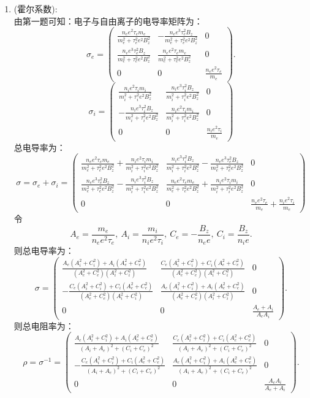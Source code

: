 \documentclass[reqno,a4paper,12pt]{amsart}
\begin{document}
\begin{enumerate}
	\item (霍尔系数): \\
	由第一题可知：电子与自由离子的电导率矩阵为：
	\[
		\sigma_e = \begin{pmatrix}
			\frac{n_ee^2\tau_em_e}{m_e^2 + \tau_e^2e^2B_z^2} & -\frac{n_ee^3\tau_e^2B_z}{m_e^2 + \tau_e^2e^2B_z^2} & 0 \\
			\frac{n_ee^3\tau_e^2B_z}{m_e^2 + \tau_e^2e^2B_z^2} & \frac{n_ee^2\tau_em_e}{m_e^2 + \tau_e^2e^2B_z^2} & 0 \\
			0 & 0 & \frac{n_ee^2\tau_e}{m_e}
		\end{pmatrix}.
	\]
	\[
		\sigma_i = \begin{pmatrix}
			\frac{n_ie^2\tau_im_i}{m_i^2 + \tau_i^2e^2B_z^2} & \frac{n_ie^3\tau_i^2B_z}{m_i^2 + \tau_i^2e^2B_z^2} & 0 \\
			-\frac{n_ie^3\tau_i^2B_z}{m_i^2 + \tau_i^2e^2B_z^2} & \frac{n_ie^2\tau_im_i}{m_i^2 + \tau_i^2e^2B_z^2} & 0 \\
			0 & 0 & \frac{n_ie^2\tau_i}{m_e}
		\end{pmatrix}
	\]
	总电导率为：
	\[
		\sigma = \sigma_e + \sigma_i = \begin{pmatrix}
			\frac{n_ee^2\tau_em_e}{m_e^2 + \tau_e^2e^2B_z^2} + \frac{n_ie^2\tau_im_i}{m_i^2 + \tau_i^2e^2B_z^2} & \frac{n_ie^3\tau_i^2B_z}{m_i^2 + \tau_i^2e^2B_z^2} - \frac{n_ee^3\tau_e^2B_z}{m_e^2 + \tau_e^2e^2B_z^2} & 0 \\
			\frac{n_ee^3\tau_e^2B_z}{m_e^2 + \tau_e^2e^2B_z^2} - \frac{n_ie^3\tau_i^2B_z}{m_i^2 + \tau_i^2e^2B_z^2} & \frac{n_ee^2\tau_em_e}{m_e^2 + \tau_e^2e^2B_z^2} + \frac{n_ie^2\tau_im_i}{m_i^2 + \tau_i^2e^2B_z^2} & 0 \\
			0 & 0 & \frac{n_ee^2\tau_e}{m_e} + \frac{n_ie^2\tau_i}{m_e}
		\end{pmatrix}
	\]
	令
	\[
		A_e = \frac{m_e}{n_ee^2\tau_e}, ~ A_i = \frac{m_i}{n_ie^2\tau_i}, ~ C_e = -\frac{B_z}{n_ee}, ~ C_i = \frac{B_z}{n_ie}.
	\]
	则总电导率为：
	\[
		\sigma = \begin{pmatrix}
			\frac{A_e(A_i^2 + C_i^2) + A_i(A_e^2 + C_e^2)}{(A_e^2 + C_e^2)(A_i^2 + C_i^2)} & \frac{C_e(A_i^2 + C_i^2) + C_i(A_e^2 + C_e^2)}{(A_e^2 + C_e^2)(A_i^2 + C_i^2)} & 0 \\
			-\frac{C_e(A_i^2 + C_i^2) + C_i(A_e^2 + C_e^2)}{(A_e^2 + C_e^2)(A_i^2 + C_i^2)} & \frac{A_e(A_i^2 + C_i^2) + A_i(A_e^2 + C_e^2)}{(A_e^2 + C_e^2)(A_i^2 + C_i^2)} & 0 \\
			0 & 0 & \frac{A_e + A_i}{A_eA_i}
		\end{pmatrix}.
	\]
	则总电阻率为：
	\[
		\rho = \sigma^{-1} = \begin{pmatrix}
			\frac{A_e(A_i^2 + C_i^2) + A_i(A_e^2 + C_e^2)}{(A_i+A_e)^2 + (C_i+C_e)^2} & \frac{C_e(A_i^2 + C_i^2) + C_i(A_e^2 + C_e^2)}{(A_i+A_e)^2 + (C_i+C_e)^2} & 0 \\
			-\frac{C_e(A_i^2 + C_i^2) + C_i(A_e^2 + C_e^2)}{(A_i+A_e)^2 + (C_i+C_e)^2} & \frac{A_e(A_i^2 + C_i^2) + A_i(A_e^2 + C_e^2)}{(A_i+A_e)^2 + (C_i+C_e)^2} & 0 \\
			0 & 0 & \frac{A_eA_i}{A_e+A_i}
		\end{pmatrix}.
	\]
\end{enumerate}
\end{document}
